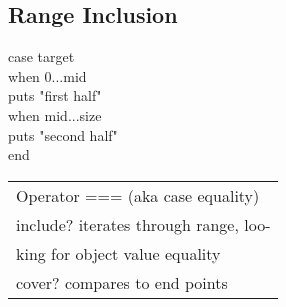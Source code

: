 \subsection*{Range Inclusion}
case target \\
when 0...mid \\
\phantom{1}\hspace{4mm}puts "first half" \\
when mid...size \\
\phantom{1}\hspace{4mm}puts "second half" \\
end\\
\begin{tabular}{ l }
\rowcolor{Gray}
Operator === (aka case equality)\\
include? iterates through range, loo-\\
king for object value equality\\
\rowcolor{Gray}
cover? compares to end points \\
\end{tabular}
\\
